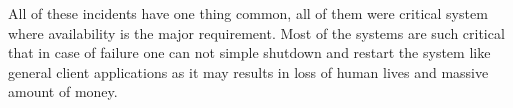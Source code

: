 All of these incidents have one thing common, all of them were critical system
where availability is the major requirement. Most of the systems are such
critical that in case of failure one can not simple shutdown and restart the
system like general client applications as it may results in loss of human lives
and massive amount of money.







